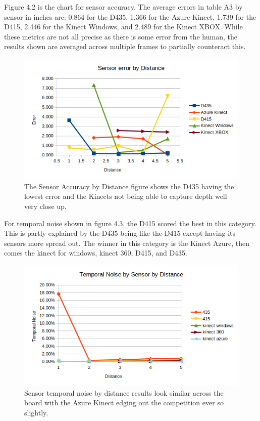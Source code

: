 Figure 4.2 is the chart for sensor accuracy. The average errors in table A3 by sensor in inches are: 0.864 for the D435, 1.366 for the Azure Kinect, 1.739 for the D415, 2.446 for the Kinect Windows, and 2.489 for the Kinect XBOX. While these metrics are not all precise as there is some error from the human, the results shown are averaged across multiple frames to partially counteract this.
\begin{figure}[!htb]
	\caption{The Sensor Accuracy by Distance figure shows the D435 having the lowest error and the Kinects not being able to capture depth well very close up.}
	\centering
	\includegraphics[width=1\textwidth]{images/sensor_accuracy.png}
\end{figure}

For temporal noise shown in figure 4.3, the D415 scored the best in this category. This is partly explained by the D435 being like the D415 except having its sensors more spread out. The winner in this category is the Kinect Azure, then comes the kinect for windows, kinect 360, D415, and D435.
\begin{figure}[!htb]
	\caption{Sensor temporal noise by distance results look similar across the board with the Azure Kinect edging out the competition ever so slightly.}
	\centering
	\includegraphics[width=1\textwidth]{images/temporal_noise.png}
\end{figure}

